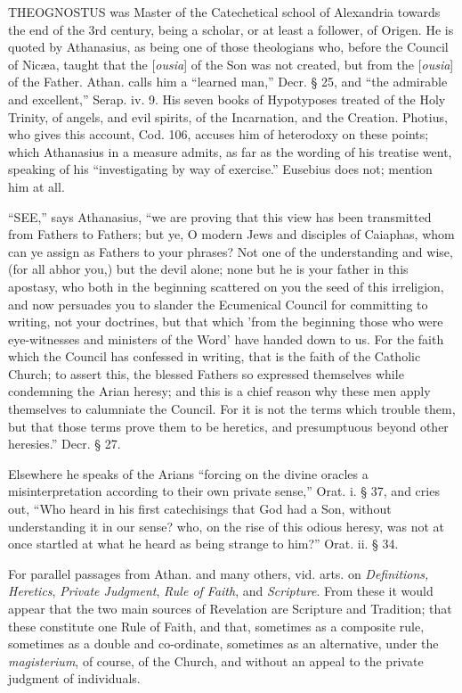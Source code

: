 
THEOGNOSTUS
was Master of the Catechetical school of Alexandria towards the end of
the 3rd century, being a scholar, or at least a follower, of Origen.
He is quoted by Athanasius, as being one of those theologians who,
before the Council of Nicæa, taught that the [\emph{ousia}] of the
Son was not created, but from the [\emph{ousia}] of the Father. Athan.
calls him a ``learned man,'' Decr. § 25, and ``the admirable and
excellent,'' Serap. iv. 9. His seven books of Hypotyposes treated of
the Holy Trinity, of angels, and evil spirits, of the Incarnation, and
the Creation. Photius, who gives this account, Cod. 106, accuses him
of heterodoxy on these points; which Athanasius in a measure admits,
as far as the wording of his treatise went, speaking of his ``investigating
by way of exercise.'' Eusebius does not; mention him at all.


``SEE,''
says Athanasius, ``we are proving that this view has been transmitted
from Fathers to Fathers; but ye, O modern Jews and disciples of
Caiaphas, whom can ye assign as Fathers to your phrases? Not one of
the understanding and wise, (for all abhor you,) but the devil alone;
none but he is your father in this apostasy, who both in the beginning
scattered on you the seed of this irreligion, and now persuades you to
slander the Ecumenical Council for committing to writing, not your
doctrines, but that which 'from the beginning those who were
eye-witnesses and ministers of the Word' have handed down to us. For
the faith which the Council has confessed in writing, that is the
faith of the Catholic Church; to assert this, the blessed Fathers so
expressed themselves while condemning the Arian heresy; and this is a
chief reason why these men apply themselves to calumniate the Council.
For it is not the terms which trouble them, but that those terms prove
them to be heretics, and presumptuous beyond other heresies.'' Decr. §
27.

Elsewhere he speaks of the Arians ``forcing on the
divine oracles a misinterpretation according to their own private
sense,'' Orat. i. § 37, and cries out, ``Who heard in his first
catechisings that God had a Son, without understanding it in our
sense? who, on the rise of this odious heresy, was not at once
startled at what he heard as being strange to him?'' Orat. ii. § 34.

For parallel passages from Athan. and many
others, vid. arts. on \emph{Definitions, Heretics}, \emph{Private
Judgment}, \emph{Rule of Faith}, and \emph{Scripture}. From these
it would appear that the two main sources of Revelation are Scripture
and Tradition; that these constitute one Rule of Faith, and that,
sometimes as a composite rule, sometimes as a double and co-ordinate,
sometimes as an alternative, under the \emph{magisterium}, of course,
of the Church, and without an appeal to the private judgment of
individuals.

